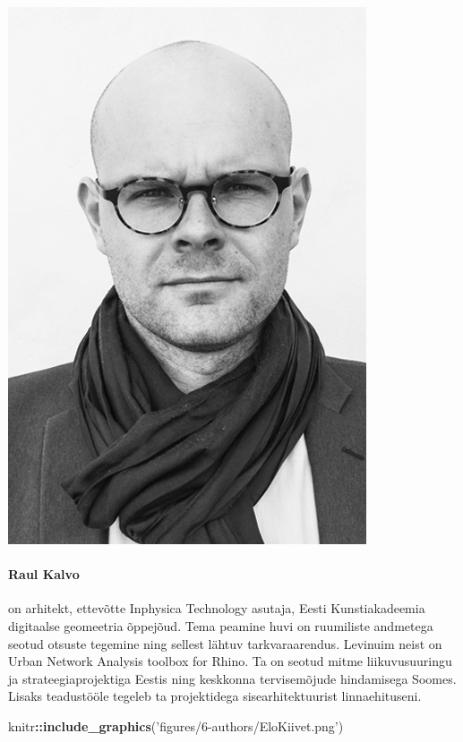 \documentclass[estonian,]{article}
\newenvironment{Shaded}{\begin{snugshade}}{\end{snugshade}}
\newcommand{\KeywordTok}[1]{\textcolor[rgb]{0.13,0.29,0.53}{\textbf{#1}}}
\newcommand{\NormalTok}[1]{#1}
\newcommand{\OperatorTok}[1]{\textcolor[rgb]{0.81,0.36,0.00}{\textbf{#1}}}
\newcommand{\StringTok}[1]{\textcolor[rgb]{0.31,0.60,0.02}{#1}}
\let\oldparagraph\paragraph
\renewcommand{\paragraph}[1]{\oldparagraph{#1}\mbox{}}
\begin{document}
\begin{flushleft}\includegraphics[width=0.5\linewidth]{figures/6-authors/RaulKalvo} \end{flushleft}

\hypertarget{raul-kalvo}{%
\paragraph{Raul Kalvo}\label{raul-kalvo}}

on arhitekt, ettevõtte Inphysica Technology asutaja, Eesti Kunstiakadeemia digitaalse geomeetria õppejõud. Tema peamine huvi on ruumiliste andmetega seotud otsuste tegemine ning sellest lähtuv tarkvaraarendus. Levinuim neist on Urban Network Analysis toolbox for Rhino. Ta on seotud mitme liikuvusuuringu ja strateegiaprojektiga Eestis ning keskkonna tervisemõjude hindamisega Soomes. Lisaks teadustööle tegeleb ta projektidega sisearhitektuurist linnaehituseni.

\begin{Shaded}
\begin{Highlighting}[]
\NormalTok{knitr}\OperatorTok{::}\KeywordTok{include_graphics}\NormalTok{(}\StringTok{'figures/6-authors/EloKiivet.png'}\NormalTok{)}
\end{Highlighting}
\end{Shaded}
\end{document}
